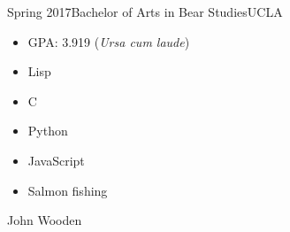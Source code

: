 \documentclass[11pt,oneside,letterpaper]{article}
\begin{document}
\begin{degree}{Spring 2017}{Bachelor of Arts in Bear Studies}{UCLA}
  \begin{itemize}
    \item GPA: 3.919 (\textit{Ursa cum laude})
  \end{itemize}
\end{degree}


\begin{minipage}[t]{1.0\textwidth}
  \begin{multicols}{2}
    \begin{itemize}
      \item Lisp
      \item C
      \item Python
      \item JavaScript
    \end{itemize}
  \end{multicols}
\end{minipage}


\begin{itemize}
  \item Salmon fishing
\end{itemize}


John Wooden
\end{document}
